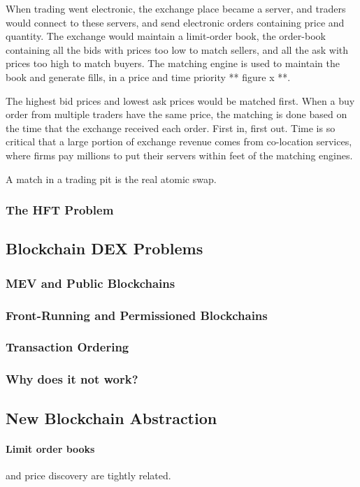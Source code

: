 \documentclass[12pt]{article}
\begin{document}
When trading went electronic, the exchange place became a server, and traders would connect to these servers, and send electronic orders containing price and quantity. The exchange would maintain a limit-order book, the order-book containing all the bids with prices too low to match sellers, and all the ask with prices too high to match buyers. The matching engine is used to maintain the book and generate fills, in a price and time priority ** figure x **. 

The highest bid prices and lowest ask prices would be matched first. When a buy order from multiple traders have the same price, the matching is done based on the time that the exchange received each order. First in, first out. Time is so critical that a large portion of exchange revenue comes from co-location services, where firms pay millions to put their servers within feet of the matching engines.  


A match in a trading pit is the real atomic swap. 
\subsubsection*{The HFT Problem}
\subsection*{Blockchain DEX Problems}
\subsubsection*{MEV and Public Blockchains}
\subsubsection*{Front-Running and Permissioned Blockchains}
\subsubsection*{Transaction Ordering}
\subsubsection*{Why does it not work?}
\subsection*{New Blockchain Abstraction}


\paragraph*{Limit order books} and price discovery are tightly related. \citep{RePEc:nbr:nberwo:6257} \cite{RePEc:eee:jfinec:v:17:y:1986:i:1:p:5-26}
\end{document}
